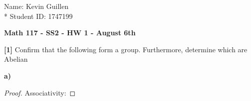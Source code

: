 \documentclass[12pt]{article}
\begin{document}
\begin{flushright}
    Name: Kevin Guillen \\*
    Student ID: 1747199
\end{flushright}
\begin{center}
    {\bf Math 117 - SS2 - HW 1 - August 6th}
\end{center}

\noindent \textbf{[1]} Confirm that the following form a group. Furthermore, determine which are Abelian

\textbf{a)}
\begin{proof}
    \noindent Associativity:

\end{proof}
\end{document}
